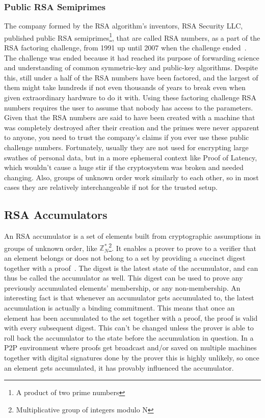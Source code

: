 \subsubsection{Public RSA Semiprimes}
The company formed by the RSA algorithm's inventors, RSA Security LLC, published public RSA semiprimes\footnote{A product of two prime numbers}, that are called RSA numbers, as a part of the RSA factoring challenge, from 1991 up until 2007 when the challenge ended~\cite{RSA_Laboratories2013-zk}. The challenge was ended because it had reached its purpose of forwarding science and understanding of common symmetric-key and public-key algorithms. Despite this, still under a half of the RSA numbers have been factored, and the largest of them might take hundreds if not even thousands of years to break even when given extraordinary hardware to do it with.
Using these factoring challenge RSA numbers requires the user to assume that nobody has access to the parameters. Given that the RSA numbers are said to have been created with a machine that was completely destroyed after their creation and the primes were never apparent to anyone, you need to trust the company's claims if you ever use these public challenge numbers. Fortunately, usually they are not used for encrypting large swathes of personal data, but in a more ephemeral context like Proof of Latency, which wouldn't cause a huge stir if the cryptosystem was broken and needed changing. Also, groups of unknown order work similarly to each other, so in most cases they are relatively interchangeable if not for the trusted setup.

\subsection{RSA Accumulators}
An RSA accumulator is a set of elements built from cryptographic assumptions in groups of unknown order, like \(\mathbb{Z}^*_N\)\footnote{Multiplicative group of integers modulo N}. It enables a prover to prove to a verifier that an element belongs or does not belong to a set by providing a succinct digest together with a proof~\cite{Tomescu2020-wq, Konstantopoulos2019-ls}. The digest is the latest state of the accumulator, and can thus be called the accumulator as well. This digest can be used to prove any previously accumulated elements' membership, or any non-membership. An interesting fact is that whenever an accumulator gets accumulated to, the latest accumulation is actually a binding commitment. This means that once an element has been accumulated to the set together with a proof, the proof is valid with every subsequent digest. This can't be changed unless the prover is able to roll back the accumulator to the state before the accumulation in question. In a P2P environment where proofs get broadcast and/or saved on multiple machines together with digital signatures done by the prover this is highly unlikely, so once an element gets accumulated, it has provably influenced the accumulator.


